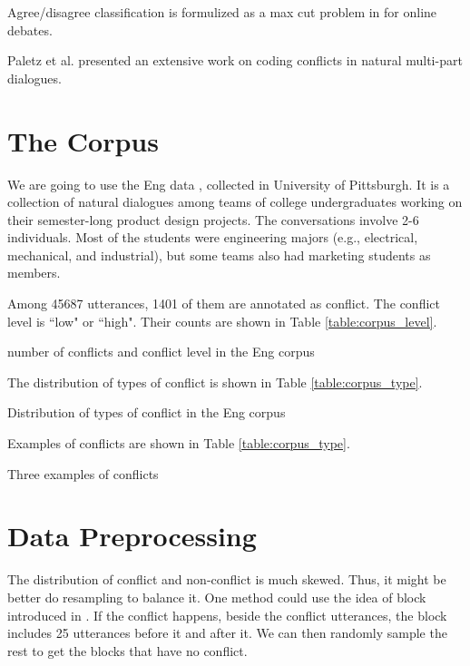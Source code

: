\documentclass[11pt,letterpaper]{article}
\begin{document}
Agree/disagree classification is formulized as a max cut problem in \cite{Murakami:2010} for online debates.

Paletz et al.  presented an extensive work on coding conflicts in natural multi-part dialogues.

\section{The Corpus}
We are going to use the Eng data \cite{Jang:2012,Friedberg:2012}, collected in University of Pittsburgh.
It is a collection of natural dialogues among teams of college undergraduates working on their semester-long product design projects.
The conversations involve 2-6 individuals. Most of the students were engineering majors (e.g., electrical, mechanical, and industrial), but some teams also had marketing students as members.

Among 45687 utterances, 1401 of them are annotated as conflict. The conflict level is ``low" or ``high". Their counts are shown in Table \ref{table:corpus_level}.
\begin{table}[!htb] 
\centering

\caption{number of conflicts and conflict level in the Eng corpus}
\label{table:corpus_level}
\end{table}

The distribution of types of conflict is shown in Table \ref{table:corpus_type}.
\begin{table*}[!htb] 
\centering

\caption{Distribution of types of conflict in the Eng corpus}
\label{table:corpus_type}
\end{table*}

Examples of conflicts are shown in Table \ref{table:corpus_type}.
\begin{table*}[!htb] 
\centering

\caption{Three examples of conflicts}
\label{table:corpus_examples}
\end{table*}

\section{Data Preprocessing}
The distribution of conflict and non-conflict is much skewed. Thus, it might be better do resampling to balance it.
One method could use the idea of block introduced in \cite{Paletz:2011}. If the conflict happens, beside the conflict utterances, the block includes 25 utterances before it and after it. We can then randomly sample the rest to get the blocks that have no conflict.
\end{document}
